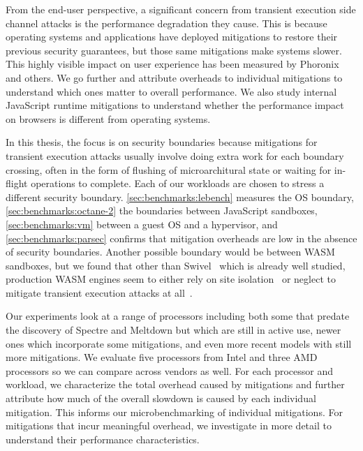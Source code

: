 
From the end-user perspective, a significant concern from transient execution side channel attacks is the performance degradation they cause.
This is because operating systems and applications have deployed mitigations to restore their previous security guarantees, but those same mitigations make systems slower.
This highly visible impact on user experience has been measured by Phoronix and others.
We go further and attribute overheads to individual mitigations to understand which ones matter to overall performance.
We also study internal JavaScript runtime mitigations to understand whether the performance impact on browsers is different from operating systems. 

In this thesis, the focus is on security boundaries because mitigations for transient execution attacks usually involve doing extra work for each boundary crossing, often in the form of flushing of microarchitural state or waiting for in-flight operations to complete.
Each of our workloads are chosen to stress a different security boundary.
\autoref{sec:benchmarks:lebench} measures the OS boundary, \autoref{sec:benchmarks:octane-2} the boundaries between JavaScript sandboxes, \autoref{sec:benchmarks:vm} between a guest OS and a hypervisor, and \autoref{sec:benchmarks:parsec} confirms that mitigation overheads are low in the absence of security boundaries.
Another possible boundary would be between WASM sandboxes, but we found that other than Swivel~\cite{narayan:swivel} which is already well studied, production WASM engines seem to either rely on site isolation~\cite{reis:site-isolation} or neglect to mitigate transient execution attacks at all~\cite{cranelift:wasm-no-mitigations}.

Our experiments look at a range of processors including both some that predate the discovery of Spectre and Meltdown but which are still in active use, newer ones which incorporate some mitigations, and even more recent models with still more mitigations.
We evaluate five processors from Intel and three AMD processors so we can compare across vendors as well.
For each processor and workload, we characterize the total overhead caused by mitigations and further attribute how much of the overall slowdown is caused by each individual mitigation.
This informs our microbenchmarking of individual mitigations.
For mitigations that incur meaningful overhead, we investigate in more detail to understand their performance characteristics.

